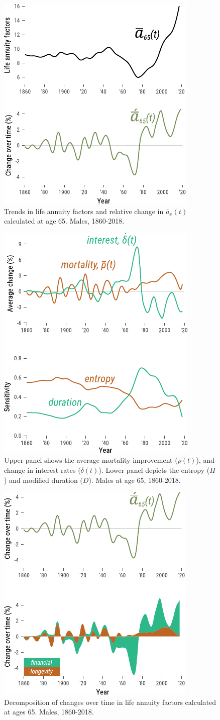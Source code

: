 \documentclass[12pt]{article}
\begin{document}
 \begin{figure}[!ht]
	\centering
	\includegraphics[width=0.5\linewidth]{Fig/axm}
	\caption{{Trends in life annuity factors and relative change in $\bar{a}_x(t)$ calculated at age 65. Males, 1860-2018.}}
	\label{fig:Fig2}
\end{figure}

\begin{figure}[!ht]
	\centering
	\includegraphics[width=0.5\linewidth]{Fig/IntMort}
	\caption{{Upper panel shows the average mortality improvement ($\bar{\rho}(t)$), and change in interest rates ($\dot{\delta}(t)$). Lower panel depicts the entropy ($H$) and modified duration ($D$). Males at age 65, 1860-2018.}}
	\label{fig:Fig3}
\end{figure}


\begin{figure}[!ht]
	\centering
	\includegraphics[width=0.5\linewidth]{Fig/DescSingle}
	\caption{{Decomposition of changes over time in life annuity factors calculated at ages 65. Males, 1860-2018.}}
	\label{fig:Fig4}
\end{figure}
\end{document}
